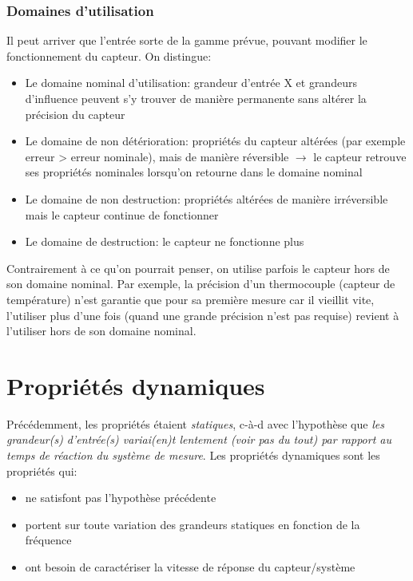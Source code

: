 \subsubsection{Domaines d'utilisation}
Il peut arriver que l'entrée sorte de la gamme prévue, pouvant modifier le fonctionnement du capteur. On distingue:
\begin{itemize}
	\item Le domaine nominal d'utilisation: grandeur d'entrée X et grandeurs d'influence peuvent s'y trouver de manière permanente sans altérer la précision du capteur
	\item Le domaine de non détérioration: propriétés du capteur altérées (par exemple erreur > erreur nominale), mais de manière réversible \(\rightarrow\) le capteur retrouve ses propriétés nominales lorsqu'on retourne dans le domaine nominal 
	\item Le domaine de non destruction: propriétés altérées de manière irréversible mais le capteur continue de fonctionner 
	\item Le domaine de destruction: le capteur ne fonctionne plus
\end{itemize}
Contrairement à ce qu'on pourrait penser, on utilise parfois le capteur hors de son domaine nominal. Par exemple, la précision d'un thermocouple (capteur de température) n'est garantie que pour sa première mesure car il vieillit vite, l'utiliser plus d'une fois (quand une grande précision n'est pas requise) revient à l'utiliser hors de son domaine nominal.

\section{Propriétés dynamiques}
Précédemment, les propriétés étaient \emph{statiques}, c-à-d avec l'hypothèse que \emph{les grandeur(s) d'entrée(s) variai(en)t lentement (voir pas du tout) par rapport au temps de réaction du système de mesure}. Les propriétés dynamiques sont les propriétés qui:
\begin{itemize}
	\item ne satisfont pas l'hypothèse précédente
	\item portent sur toute variation des grandeurs statiques en fonction de la fréquence
	\item ont besoin de caractériser la vitesse de réponse du capteur/système
\end{itemize}
